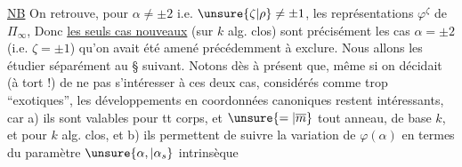 \uline{NB} On retrouve, pour $\alpha\ne\pm2$ i.e. $\unsure{\zeta|\rho}\ne\pm1$, les représentations $\varphi^\zeta$ de $\Pi_\infty$,  Donc \uline{les seuls cas nouveaux} (sur $k$ alg. clos) sont précisément les cas $\alpha=\pm2$ (i.e. $\zeta=\pm1$) qu'on avait été amené précédemment à exclure. Nous allons les étudier séparément au § suivant.
Notons dès à présent que, même si on décidait (à tort !) de ne pas s'intéresser à ces deux cas, considérés comme trop ``exotiques'', les développements en coordonnées canoniques restent intéressants, car a) ils sont valables pour tt corps, et $\unsure{=|\overline{m}}$ tout anneau, de base $k$, et   pour $k$ alg. clos, et b) ils permettent de suivre la variation de \deleted{$\unsure{\Pi|\varphi}$} $\varphi(\alpha)$ en termes du paramètre $\unsure{\alpha,|\alpha_s}$ intrinsèque 
